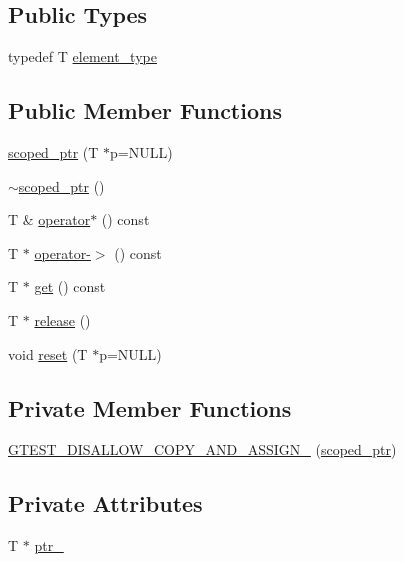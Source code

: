 \subsection*{Public Types}
\begin{DoxyCompactItemize}
\item 
typedef T \hyperlink{classtesting_1_1internal_1_1scoped__ptr_ae755ffeebada8e20b68c1d1ffa91cf13}{element\+\_\+type}
\end{DoxyCompactItemize}
\subsection*{Public Member Functions}
\begin{DoxyCompactItemize}
\item 
\hyperlink{classtesting_1_1internal_1_1scoped__ptr_adb972432999a0c63720df148964ac2a5}{scoped\+\_\+ptr} (T $\ast$p=N\+U\+LL)
\item 
\hyperlink{classtesting_1_1internal_1_1scoped__ptr_ab721de9bf4369f002fb563e82352ee36}{$\sim$scoped\+\_\+ptr} ()
\item 
T \& \hyperlink{classtesting_1_1internal_1_1scoped__ptr_a0aba95f68eceb6422a0b50b6f92047c2}{operator$\ast$} () const
\item 
T $\ast$ \hyperlink{classtesting_1_1internal_1_1scoped__ptr_a2b465830a322e2c3ea420e5ccf0472f4}{operator-\/$>$} () const
\item 
T $\ast$ \hyperlink{classtesting_1_1internal_1_1scoped__ptr_aa5984291e12453f1e81b7676d1fa26fd}{get} () const
\item 
T $\ast$ \hyperlink{classtesting_1_1internal_1_1scoped__ptr_a7a4f3e568d81a5d8bcb5f8d6bf5130b1}{release} ()
\item 
void \hyperlink{classtesting_1_1internal_1_1scoped__ptr_acac03266a43359801aff0de5c990bec0}{reset} (T $\ast$p=N\+U\+LL)
\end{DoxyCompactItemize}
\subsection*{Private Member Functions}
\begin{DoxyCompactItemize}
\item 
\hyperlink{classtesting_1_1internal_1_1scoped__ptr_aa905e98e04e868208e9fb850b93d58f4}{G\+T\+E\+S\+T\+\_\+\+D\+I\+S\+A\+L\+L\+O\+W\+\_\+\+C\+O\+P\+Y\+\_\+\+A\+N\+D\+\_\+\+A\+S\+S\+I\+G\+N\+\_\+} (\hyperlink{classtesting_1_1internal_1_1scoped__ptr}{scoped\+\_\+ptr})
\end{DoxyCompactItemize}
\subsection*{Private Attributes}
\begin{DoxyCompactItemize}
\item 
T $\ast$ \hyperlink{classtesting_1_1internal_1_1scoped__ptr_ab69d9f1f216ae91f8b8abca63e797397}{ptr\+\_\+}
\end{DoxyCompactItemize}
